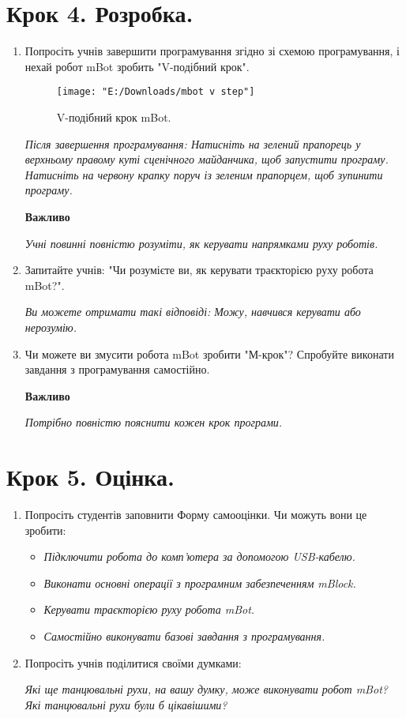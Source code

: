 \documentclass[12pt, a4paper]{article}
\begin{document}
\section*{\textbf{Крок 4. Розробка.}}
\begin{enumerate}
	\item Попросіть учнів завершити програмування згідно зі схемою програмування, і нехай робот mBot зробить "V-подібний крок".
	
	\begin{figure} [H]
		\centering
		\texttt{[image: "E:/Downloads/mbot v step"]}
		\caption[V-подібний крок mBot.]{V-подібний крок mBot.}
		\label{fig:mbot-v-step}
	\end{figure}
	
	\textit{Після завершення програмування:
		Натисніть на зелений прапорець у верхньому правому куті сценічного майданчика, щоб запустити програму.
		Натисніть на червону крапку поруч із зеленим прапорцем, щоб зупинити програму.}
	
	\textbf{Важливо}
	
	\textit{Учні повинні повністю розуміти, як керувати напрямками руху роботів.}
	\item Запитайте учнів: "Чи розумієте ви, як керувати траєкторією руху робота mBot?".
	
	\textit{Ви можете отримати такі відповіді: Можу, навчився керувати або нерозумію.}
	
	\item Чи можете ви змусити робота mBot зробити "М-крок"? Спробуйте виконати завдання з програмування самостійно.
	
	\textbf{Важливо}
	
	\textit{Потрібно повністю пояснити кожен крок програми.}
	
\end{enumerate}

\section*{\textbf{Крок 5. Оцінка.}}
\begin{enumerate}
	\item Попросіть студентів заповнити Форму самооцінки. Чи можуть вони це зробити:
	
	
		\begin{itemize}
			\item \textit{Підключити робота до комп'ютера за допомогою USB-кабелю.}
			\item \textit{Виконати основні операції з програмним забезпеченням mBlock.}
			\item \textit{Керувати траєкторією руху робота mBot.}
			\item \textit{Самостійно виконувати базові завдання з програмування.}
		\end{itemize}
	\item Попросіть учнів поділитися своїми думками:
	
	\textit{Які ще танцювальні рухи, на вашу думку, може виконувати робот mBot?
		Які танцювальні рухи були б цікавішими?}

\end{enumerate}
\end{document}
